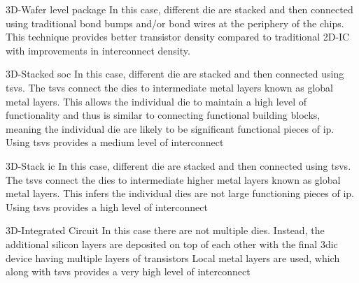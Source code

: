 \begin{outline}

  \1 3D-Wafer level package \cite{itrs2015_interconn}
    \2 In this case, different die are stacked and then connected using traditional bond bumps and/or bond wires at the periphery of the chips.
    \2 This technique provides better transistor density compared to traditional 2D-IC with improvements in interconnect density.

  \1 3D-Stacked \ac{soc} \cite{itrs2015_interconn}
    \2 In this case, different die are stacked and then connected using \acp{tsv}. The \acp{tsv} connect the dies to intermediate metal layers known as global metal layers. This allows the individual die to maintain a high level of functionality and thus is similar to connecting functional building blocks, meaning the individual die are likely to be significant functional pieces of \ac{ip}.
    \2 Using \acp{tsv} provides a medium level of interconnect

  \1 3D-Stack \ac{ic} \cite{itrs2015_interconn}
    \2 In this case, different die are stacked and then connected using \acp{tsv}. The \acp{tsv} connect the dies to intermediate higher metal layers known as global metal layers. This infers the individual dies are not large functioning pieces of \ac{ip}.
    \2 Using \acp{tsv} provides a high level of interconnect

  \1 3D-Integrated Circuit \cite{itrs2015_interconn}
    \2 In this case there are not multiple dies. Instead, the additional silicon layers are deposited on top of each other with the final \ac{3dic} device having multiple layers of transistors
    \2 Local metal layers are used, which along with \acp{tsv} provides a very high level of interconnect
\end{outline}

